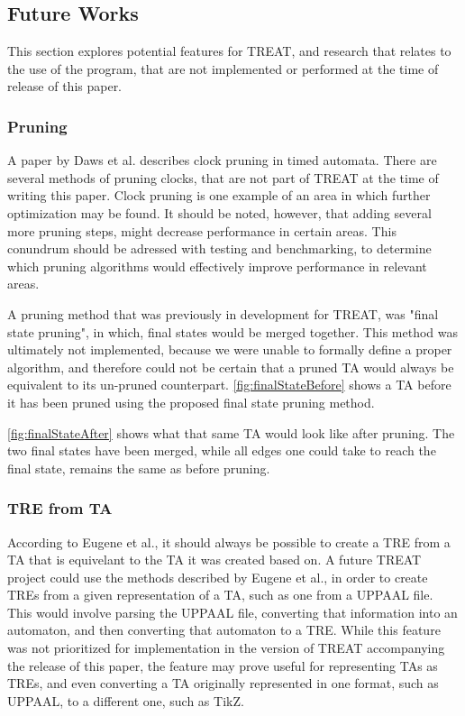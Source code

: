 \subsection{Future Works}\label{subsec:futureWorks}
This section explores potential features for TREAT, and research that relates to the use of the program, that are not implemented or performed at the time of release of this paper.

\subsubsection{Pruning}\label{futureWorks:pruning}
A paper by Daws et al. \cite{Daws1996} describes clock pruning in timed automata. There are several methods of pruning clocks, that are not part of TREAT at the time of writing this paper.
Clock pruning is one example of an area in which further optimization may be found. It should be noted, however, that adding several more pruning steps, might decrease performance in certain areas.
This conundrum should be adressed with testing and benchmarking, to determine which pruning algorithms would effectively improve performance in relevant areas.

A pruning method that was previously in development for TREAT, was "final state pruning", in which, final states would be merged together. This method was ultimately not implemented, because we were unable to formally define a proper algorithm, and therefore could not be certain that a pruned TA would always be equivalent to its un-pruned counterpart.
\cref{fig:finalStateBefore} shows a TA before it has been pruned using the proposed final state pruning method.



\cref{fig:finalStateAfter} shows what that same TA would look like after pruning. The two final states have been merged, while all edges one could take to reach the final state, remains the same as before pruning.




\subsubsection{TRE from TA}
According to Eugene et al.\cite{Eugene2001}, it should always be possible to create a TRE from a TA that is equivelant to the TA it was created based on.
A future TREAT project could use the methods described by Eugene et al., in order to create TREs from a given representation of a TA, such as one from a UPPAAL file.
This would involve parsing the UPPAAL file, converting that information into an automaton, and then converting that automaton to a TRE.
While this feature was not prioritized for implementation in the version of TREAT accompanying the release of this paper, the feature may prove useful for representing TAs as TREs, and even converting a TA originally represented in one format, such as UPPAAL, to a different one, such as TikZ.


